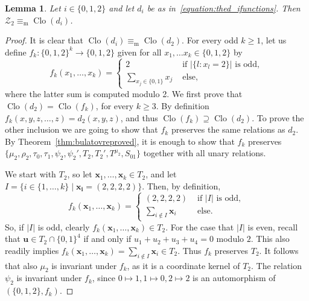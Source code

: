 \documentclass[12pt]{amsart}
\newtheorem{lemma}[theorem]{Lemma}
\theoremstyle{definition}
\theoremstyle{definition}
\newcommand{\clo}[1]{\mathcal{#1}}
\DeclareMathOperator{\Clo}{Clo}
\newcommand{\minorequivalentto}{\equiv_{\mathrm{m}}}
\begin{document}
\begin{lemma}\label{lemma:the_turning_of_the_tide}
  Let $i\in \{0,1,2\}$ and let $d_i$ be as in~\eqref{equation:thed_ifunctions}.
 Then $\clo{Z}_2 \minorequivalentto \Clo(d_i)$.
\end{lemma}
\begin{proof}
It is clear that $\Clo(d_i)\minorequivalentto\Clo(d_2)$.
 For every odd $k\geq 1$, let us define  $f_k\colon \{0,1,2\}^{k}\to \{0,1,2\}$ given for 
    all $x_1, \dots x_{k}\in \{0,1,2\}$ by 
    \[
    f_k(x_1, \dots, x_{k})=\begin{cases}
        2 & \text{ if } |\{l \colon x_{l}=2\}| \text{ is odd},\\     
        \sum_{x_j \in \{0,1\}} x_j & \text{ else},
    \end{cases}
    \]
where the latter sum is computed modulo 2. We first prove that $\Clo(d_2) = \Clo(f_k)$, for every $k \geq 3$. By definition $f_k(x,y,z,\dots,z)= d_2(x,y,z)$, and thus $\Clo(f_k) \supseteq \Clo(d_2)$. To prove the other inclusion we are going to show that $f_k$ preserves the same relations as $d_2$. By Theorem~\ref{thm:bulatovreproved}, it is enough to show that $f_k$ preserves $\{\mu_2, \rho_2, \tau_0,\tau_1, \psi_2, \psi_2' ,T_2,T_2',T^{\mu_2}, S_{01} \}$ together with all unary relations.

We start with $T_2$, so let $\boldsymbol{x}_1,\ldots,\boldsymbol{x}_{k} \in T_2$, and let $I = \{ i \in \{1,\ldots,k\} \mid \boldsymbol{x_i} = (2,2,2,2)\}$. Then, by definition,     \[
    f_k(\boldsymbol{x}_1,\ldots,\boldsymbol{x}_{k})=\begin{cases}
        (2,2,2,2) & \text{ if } |I| \text{ is odd},\\     
        \sum_{i \notin I} \boldsymbol{x}_i & \text{ else}.
    \end{cases}
    \]
So, if $|I|$ is odd, clearly $f_k(\boldsymbol{x}_1,\ldots,\boldsymbol{x}_{k}) \in T_2$. For the case that $|I|$ is even, recall that $\mathbf{u} \in T_2 \cap \{0,1\}^4$ if and only if $u_1+u_2+u_3+u_4 = 0$ modulo $2$. This also readily implies $f_k(\boldsymbol{x}_1,\ldots,\boldsymbol{x}_{k}) = \sum_{i \notin I} \boldsymbol{x}_i \in T_2$. Thus $f_k$ preserves $T_2$. It follows that also $\mu_2$ is invariant under $f_k$, as it is a coordinate kernel of $T_2$. The relation $\psi_2$ is invariant under $f_k$, since $0\mapsto 1, 1 \mapsto 0, 2\mapsto 2$ is an automorphism of $(\{0,1,2\},f_k)$. 


\end{proof}
\end{document}
